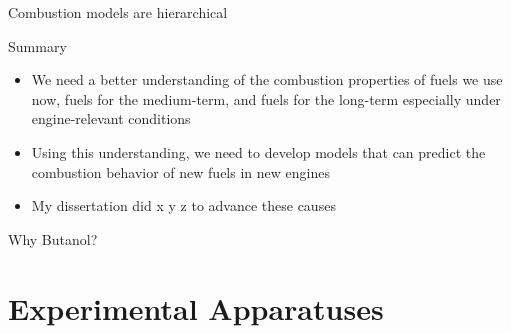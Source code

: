 \documentclass{beamer}
\begin{document}
\begin{frame}{Combustion models are hierarchical}
{    }
\end{frame}

\begin{frame}{Summary}
    \begin{itemize}
        \item We need a better understanding of the combustion properties of fuels we use now, fuels for the medium-term, and fuels for the long-term especially under engine-relevant conditions
        \item Using this understanding, we need to develop models that can predict the combustion behavior of new fuels in new engines
        \item My dissertation did x y z to advance these causes
    \end{itemize}
\end{frame}

\begin{frame}{Why Butanol?}
\end{frame}

\section{Experimental Apparatuses}
\end{document}
